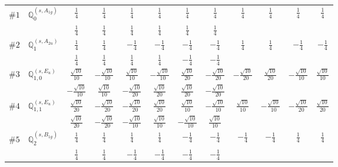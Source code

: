 \documentclass[fleqn,9pt,landscape]{jsarticle}
\begin{document}
\begin{center}
\begin{longtable}{lcccccccccc}
$ \#1\quad \mathbb{Q}_{0}^{(s,A_{1g})} $ & $ \frac{1}{4} $ & $ \frac{1}{4} $ & $ \frac{1}{4} $ & $ \frac{1}{4} $ & $ \frac{1}{4} $ & $ \frac{1}{4} $ & $ \frac{1}{4} $ & $ \frac{1}{4} $ & $ \frac{1}{4} $ & $ \frac{1}{4} $ \\
& $ \frac{1}{4} $ & $ \frac{1}{4} $ & $ \frac{1}{4} $ & $ \frac{1}{4} $ & $ \frac{1}{4} $ & $ \frac{1}{4} $ & $  $ & $  $ & $  $ & $  $ \\ \hline
$ \#2\quad \mathbb{Q}_{1}^{(s,A_{2u})} $ & $ \frac{1}{4} $ & $ \frac{1}{4} $ & $ - \frac{1}{4} $ & $ - \frac{1}{4} $ & $ - \frac{1}{4} $ & $ - \frac{1}{4} $ & $ \frac{1}{4} $ & $ \frac{1}{4} $ & $ - \frac{1}{4} $ & $ - \frac{1}{4} $ \\
& $ \frac{1}{4} $ & $ \frac{1}{4} $ & $ \frac{1}{4} $ & $ \frac{1}{4} $ & $ - \frac{1}{4} $ & $ - \frac{1}{4} $ & $  $ & $  $ & $  $ & $  $ \\ \hline
$ \#3\quad \mathbb{Q}_{1,0}^{(s,E_{u})} $ & $ \frac{\sqrt{10}}{10} $ & $ - \frac{\sqrt{10}}{10} $ & $ \frac{\sqrt{10}}{10} $ & $ - \frac{\sqrt{10}}{10} $ & $ \frac{\sqrt{10}}{20} $ & $ - \frac{\sqrt{10}}{20} $ & $ - \frac{\sqrt{10}}{20} $ & $ \frac{\sqrt{10}}{20} $ & $ - \frac{\sqrt{10}}{10} $ & $ \frac{\sqrt{10}}{10} $ \\
& $ - \frac{\sqrt{10}}{10} $ & $ \frac{\sqrt{10}}{10} $ & $ - \frac{\sqrt{10}}{20} $ & $ \frac{\sqrt{10}}{20} $ & $ \frac{\sqrt{10}}{20} $ & $ - \frac{\sqrt{10}}{20} $ & $  $ & $  $ & $  $ & $  $ \\ \hline
$ \#4\quad \mathbb{Q}_{1,1}^{(s,E_{u})} $ & $ \frac{\sqrt{10}}{20} $ & $ - \frac{\sqrt{10}}{20} $ & $ - \frac{\sqrt{10}}{20} $ & $ \frac{\sqrt{10}}{20} $ & $ \frac{\sqrt{10}}{10} $ & $ - \frac{\sqrt{10}}{10} $ & $ \frac{\sqrt{10}}{10} $ & $ - \frac{\sqrt{10}}{10} $ & $ - \frac{\sqrt{10}}{20} $ & $ \frac{\sqrt{10}}{20} $ \\
& $ \frac{\sqrt{10}}{20} $ & $ - \frac{\sqrt{10}}{20} $ & $ - \frac{\sqrt{10}}{10} $ & $ \frac{\sqrt{10}}{10} $ & $ - \frac{\sqrt{10}}{10} $ & $ \frac{\sqrt{10}}{10} $ & $  $ & $  $ & $  $ & $  $ \\ \hline
$ \#5\quad \mathbb{Q}_{2}^{(s,B_{1g})} $ & $ \frac{1}{4} $ & $ \frac{1}{4} $ & $ \frac{1}{4} $ & $ \frac{1}{4} $ & $ - \frac{1}{4} $ & $ - \frac{1}{4} $ & $ - \frac{1}{4} $ & $ - \frac{1}{4} $ & $ \frac{1}{4} $ & $ \frac{1}{4} $ \\
& $ \frac{1}{4} $ & $ \frac{1}{4} $ & $ - \frac{1}{4} $ & $ - \frac{1}{4} $ & $ - \frac{1}{4} $ & $ - \frac{1}{4} $ & $  $ & $  $ & $  $ & $  $ \\ \hline

\end{longtable}
\end{center}
\end{document}
